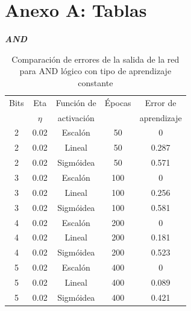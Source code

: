 \documentclass[%
    final,
    reprint,
    notitlepage,
    narroweqnarray,
    inline,
    twoside,
    invited
    ]{ieee}
\begin{document}









\clearpage
\onecolumn
\section*{Anexo A: Tablas}
 
\begin{center}
\textbf{\emph{AND}}
\end{center}

\begin{table}[H]
\begin{center}
\begin{tabular}{|c|c|c|c|c|}
\hline
Bits &  Eta & Función de &  Épocas & Error de\\
 & $\eta$ & activación &  & aprendizaje\\

\hline
\hline

2 & 0.02 & Escalón & 50 & 0\\
\hline
2 & 0.02 & Lineal & 50 & 0.287\\
\hline
2 & 0.02 & Sigmóidea & 50 & 0.571\\
\hline
\hline
3 & 0.02 & Escalón & 100 & 0\\
\hline
3 & 0.02 & Lineal & 100 & 0.256\\
\hline
3 & 0.02 & Sigmóidea & 100 & 0.581\\
\hline
\hline
4 & 0.02 & Escalón & 200 & 0\\
\hline
4 & 0.02 & Lineal & 200 & 0.181\\
\hline
4 & 0.02 & Sigmóidea & 200 & 0.523\\
\hline
\hline
5 & 0.02 & Escalón & 400 & 0\\
\hline
5 & 0.02 & Lineal & 400 & 0.089\\
\hline
5 & 0.02 & Sigmóidea & 400 & 0.421\\
\hline

\end{tabular}
\end{center}
\caption{Comparación de errores de la salida de la red para AND lógico con tipo de aprendizaje constante}\label{tablaIDFS}
\end{table}
\end{document}
